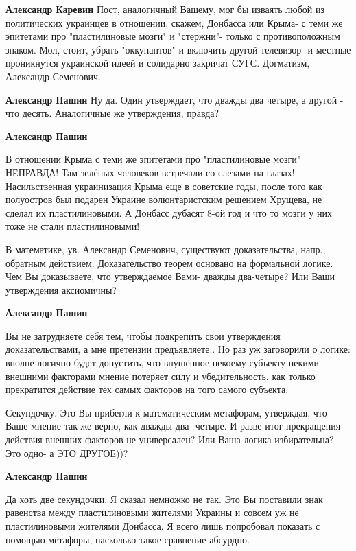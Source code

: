 \begin{itemize}
\begin{itemize}
\textbf{Александр Каревин} Пост, аналогичный Вашему, мог бы изваять любой из политических украинцев в отношении, скажем, Донбасса или Крыма- с теми же эпитетами про "пластилиновые мозги" и "стержни"- только с противоположным знаком. Мол, стоит, убрать "оккупантов" и включить другой телевизор- и местные проникнутся украинской идеей и солидарно закричат СУГС. Догматизм, Александр Семенович.

\textbf{Александр Пашин} Ну да. Один утверждает, что дважды два четыре, а другой - что десять. Аналогичные же утверждения, правда?

\textbf{Александр Пашин} 

В отношении Крыма с теми же эпитетами про "пластилиновые мозги" НЕПРАВДА! Там
зелёных человеков встречали со слезами на глазах! Насильственная украинизация
Крыма еще в советские годы, после того как полуостров был подарен Украине
волюнтаристским решением Хрущева, не сделал их пластилиновыми. А Донбасс
дубасят 8-ой год и что то мозги у них тоже не стали пластилиновыми!


В математике, ув. Александр Семенович, существуют доказательства, напр.,
обратным действием. Доказательство теорем основано на формальной логике. Чем Вы
доказываете, что утверждаемое Вами- дважды два-четыре? Или Ваши утверждения
аксиомичны?

\textbf{Александр Пашин} 

Вы не затрудняете себя тем, чтобы подкрепить свои утверждения доказательствами,
а мне претензии предъявляете.. Но раз уж заговорили о логике: вполне логично
будет допустить, что внушённое некоему субъекту некими внешними факторами
мнение потеряет силу и убедительность, как только прекратится действие тех
самых факторов на того самого субъекта.


Секундочку. Это Вы прибегли к математическим метафорам, утверждая, что Ваше
мнение так же верно, как дважды два- четыре. И разве итог прекращения действия
внешних факторов не универсален? Или Ваша логика избирательна? Это одно- а ЭТО
ДРУГОЕ))?

\textbf{Александр Пашин} 

Да хоть две секундочки. Я сказал немножко не так. Это Вы поставили знак
равенства между пластилиновыми жителями Украины и совсем уж не пластилиновыми
жителями Донбасса. Я всего лишь попробовал показать с помощью метафоры,
насколько такое сравнение абсурдно.


\end{itemize}
\end{itemize}

